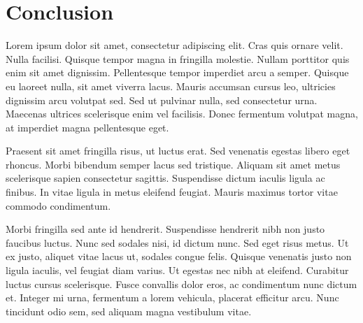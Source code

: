 
\chapter{Conclusion}

Lorem ipsum dolor sit amet, consectetur adipiscing elit. Cras quis ornare velit. Nulla facilisi. Quisque tempor magna in fringilla molestie. Nullam porttitor quis enim sit amet dignissim. Pellentesque tempor imperdiet arcu a semper. Quisque eu laoreet nulla, sit amet viverra lacus. Mauris accumsan cursus leo, ultricies dignissim arcu volutpat sed. Sed ut pulvinar nulla, sed consectetur urna. Maecenas ultrices scelerisque enim vel facilisis. Donec fermentum volutpat magna, at imperdiet magna pellentesque eget.

Praesent sit amet fringilla risus, ut luctus erat. Sed venenatis egestas libero eget rhoncus. Morbi bibendum semper lacus sed tristique. Aliquam sit amet metus scelerisque sapien consectetur sagittis. Suspendisse dictum iaculis ligula ac finibus. In vitae ligula in metus eleifend feugiat. Mauris maximus tortor vitae commodo condimentum.

Morbi fringilla sed ante id hendrerit. Suspendisse hendrerit nibh non justo faucibus luctus. Nunc sed sodales nisi, id dictum nunc. Sed eget risus metus. Ut ex justo, aliquet vitae lacus ut, sodales congue felis. Quisque venenatis justo non ligula iaculis, vel feugiat diam varius. Ut egestas nec nibh at eleifend. Curabitur luctus cursus scelerisque. Fusce convallis dolor eros, ac condimentum nunc dictum et. Integer mi urna, fermentum a lorem vehicula, placerat efficitur arcu. Nunc tincidunt odio sem, sed aliquam magna vestibulum vitae.
